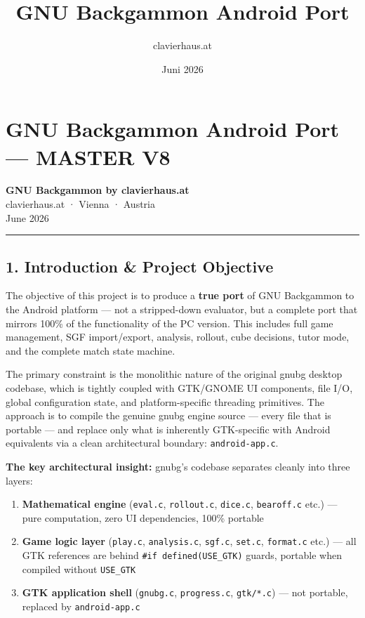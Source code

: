 \documentclass[11pt,a4paper]{article}
\title{\textbf{GNU Backgammon Android Port}}
\author{clavierhaus.at}
\date{Juni 2026}
\providecommand{\tightlist}{\setlength{\itemsep}{2pt}\setlength{\parskip}{0pt}}
\begin{document}
\maketitle\thispagestyle{fancy}

\tableofcontents\newpage

\section{GNU Backgammon Android Port --- MASTER
V8}\label{gnu-backgammon-android-port-master-v8}

\textbf{GNU Backgammon by clavierhaus.at}\\
clavierhaus.at · Vienna · Austria\\
June 2026

\begin{center}\rule{0.5\linewidth}{0.5pt}\end{center}

\subsection{1. Introduction \& Project
Objective}\label{introduction-project-objective}

The objective of this project is to produce a \textbf{true port} of GNU
Backgammon to the Android platform --- not a stripped-down evaluator,
but a complete port that mirrors 100\% of the functionality of the PC
version. This includes full game management, SGF import/export,
analysis, rollout, cube decisions, tutor mode, and the complete match
state machine.

The primary constraint is the monolithic nature of the original gnubg
desktop codebase, which is tightly coupled with GTK/GNOME UI components,
file I/O, global configuration state, and platform-specific threading
primitives. The approach is to compile the genuine gnubg engine source
--- every file that is portable --- and replace only what is inherently
GTK-specific with Android equivalents via a clean architectural
boundary: \texttt{android-app.c}.

\textbf{The key architectural insight:} gnubg's codebase separates
cleanly into three layers:

\begin{enumerate}
\def\labelenumi{\arabic{enumi}.}
\tightlist
\item
  \textbf{Mathematical engine} (\texttt{eval.c}, \texttt{rollout.c},
  \texttt{dice.c}, \texttt{bearoff.c} etc.) --- pure computation, zero
  UI dependencies, 100\% portable
\item
  \textbf{Game logic layer} (\texttt{play.c}, \texttt{analysis.c},
  \texttt{sgf.c}, \texttt{set.c}, \texttt{format.c} etc.) --- all GTK
  references are behind \texttt{\#if\ defined(USE\_GTK)} guards,
  portable when compiled without \texttt{USE\_GTK}
\item
  \textbf{GTK application shell} (\texttt{gnubg.c}, \texttt{progress.c},
  \texttt{gtk/*.c}) --- not portable, replaced by \texttt{android-app.c}
\end{enumerate}
\end{document}
